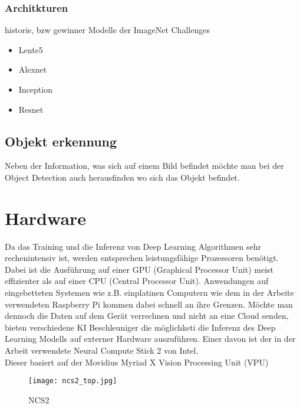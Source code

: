\subsubsection{Architkturen}
historie, bzw gewinner Modelle der ImageNet Challenges

\begin{itemize}
    \item Lente5
    \item Alexnet
    \item Inception
    \item Resnet
\end{itemize}

\subsection{Objekt erkennung}\label{subsec:objdet_det}

Neben der Information, was sich auf einem Bild befindet möchte
man bei der Object Detection auch herausfinden wo sich das 
Objekt befindet.




\section{Hardware}\label{sec:hardware}

Da das Training und die Inferenz von Deep Learning Algorithmen
 sehr rechenintensiv ist, werden entsprechen leistungsfähige 
Prozessoren benötigt. Dabei ist die Ausführung auf einer GPU 
(Graphical Processor Unit) meist effizienter als auf einer 
CPU (Central Processor Unit). Anwendungen auf eingebetteten Systemen
wie z.B. einplatinen Computern wie dem in der Arbeite verwendeten
Raspberry Pi kommen dabei schnell an ihre Grenzen.
Möchte man dennoch die Daten auf dem Gerät verrechnen und 
nicht an eine Cloud senden, bieten verschiedene KI Beschleuniger 
die möglichketi die Inferenz des Deep Learning Modells 
auf externer Hardware auszuführen. Einer davon ist der in der 
Arbeit verwendete Neural Compute Stick 2 von Intel.
\\
Dieser basiert auf der Movidius Myriad X Vision Processing Unit (VPU)
\cite{haussermannFunktionUndEffizienz}

\begin{figure}[htb]
    \centering
    \label{fig:ncs2}
    \texttt{[image: ncs2\_top.jpg]}
    \caption{NCS2}
\end{figure}


